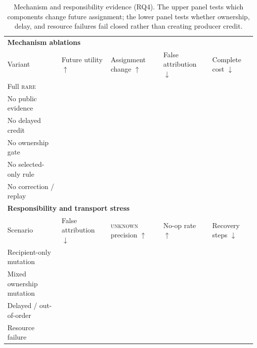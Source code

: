\documentclass[sigconf,anonymous]{aamas}
\newcommand{\blank}{\textemdash}
\newcommand{\rare}{\textsc{rare}}
\newcommand{\unknown}{\textsc{unknown}}
\newcommand{\metric}[1]{\makecell[c]{#1}}
\begin{document}
\begin{table}[t]
\centering
\small
\setlength{\tabcolsep}{4pt}
\renewcommand{\arraystretch}{1.10}
\begin{tabular}{l*{4}{>{\centering\arraybackslash}p{}}}
\toprule
\multicolumn{5}{l}{\textbf{Mechanism ablations}}\\
Variant & \metric{Future\\utility $\uparrow$} & \metric{Assignment\\change $\uparrow$} & \metric{False\\attribution $\downarrow$} & \metric{Complete\\cost $\downarrow$}\\
\midrule
Full \rare{} & \blank & \blank & \blank & \blank\\
No public evidence & \blank & \blank & \blank & \blank\\
No delayed credit & \blank & \blank & \blank & \blank\\
No ownership gate & \blank & \blank & \blank & \blank\\
No selected-only rule & \blank & \blank & \blank & \blank\\
No correction / replay & \blank & \blank & \blank & \blank\\
\midrule
\multicolumn{5}{l}{\textbf{Responsibility and transport stress}}\\
Scenario & \metric{False\\attribution $\downarrow$} & \metric{\unknown{}\\precision $\uparrow$} & \metric{No-op\\rate $\uparrow$} & \metric{Recovery\\steps $\downarrow$}\\
\midrule
Recipient-only mutation & \blank & \blank & \blank & \blank\\
Mixed ownership mutation & \blank & \blank & \blank & \blank\\
Delayed / out-of-order & \blank & \blank & \blank & \blank\\
Resource failure & \blank & \blank & \blank & \blank\\
\bottomrule
\end{tabular}
\caption{Mechanism and responsibility evidence (RQ4). The upper panel tests which components change future assignment; the lower panel tests whether ownership, delay, and resource failures fail closed rather than creating producer credit.}
\label{tab:body-safety-ablation}
\end{table}
\end{document}

